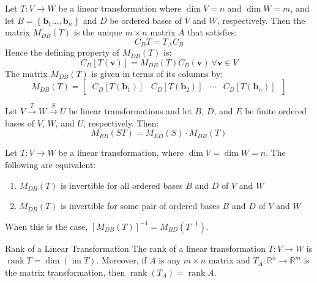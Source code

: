 \documentclass[12pt]{article}
\begin{document}
\begin{theorem}{}{}
    Let $ T : V \to W $ be a linear transformation where $ \dim V = n $ and $ \dim W = m $, and let $ B = \left\{ \mathbf{b}_1 \dots, \mathbf{b}_n \right\} $ and $ D $ be ordered bases of $ V $ and $ W $, respectively. Then the matrix $ M_{DB} \left( T \right) $ is the unique $ m \times n $ matrix $ A $ that satisfies:
    \[ C_D T = T_A C_B \]
    Hence the defining property of $ M_{DB} \left( T \right) $ is:
    \[ C_D \left[ T \left( \mathbf{v} \right) \right] = M_{DB} \left( T \right) C_B \left( \mathbf{v} \right) \ \forall \mathbf{v} \in V \]
    The matrix $ M_{DB} \left( T \right) $ is given in terms of its columns by:
     \[ M_{DB} \left( T \right) = \begin{bmatrix} \ C_D \left[ T \left( \mathbf{b}_1 \right) \right] & C_D \left[ T \left( \mathbf{b}_2 \right) \right] & \cdots & C_D \left[ T \left( \mathbf{b}_n \right) \right] \ \end{bmatrix} \]
\end{theorem}

\begin{theorem}{}{}
    Let $ V \xrightarrow{T} W \xrightarrow{S} U $ be linear transformations and let $ B $, $ D $, and $ E $ be finite ordered bases of $ V $, $ W $, and $ U $, respectively. Then:
    \[ M_{EB} \left( ST \right) = M_{ED} \left( S \right) \cdot M_{DB} \left( T \right) \]
\end{theorem}

\begin{theorem}{}{}
    Let $ T : V \to W $ be a linear transformation, where $ \dim V = \dim W = n $. The following are equivalent:
    \begin{enumerate}[label=(\roman*)]
        \item $ M_{DB} \left( T \right) $ is invertible for all ordered bases $ B $ and $ D $ of $ V $ and $ W $
        \item $ M_{DB} \left( T \right) $ is invertible for some pair of ordered bases $ B $ and $ D $ of $ V $ and $ W $
    \end{enumerate}
    When this is the case, $ \left[ M_{DB} \left( T \right) \right]^{-1} = M_{BD} \left( T^{-1} \right) $.
\end{theorem}

\begin{definition}{Rank of a Linear Transformation}{}
    The rank of a linear transformation $ T : V \to W $ is $ \operatorname{rank} T = \dim \left( \operatorname{im} T \right) $. Moreover, if $ A $ is any $ m \times n $ matrix and $ T_A : \mathbb{R}^n \to \mathbb{R}^m $ is the matrix transformation, then $ \operatorname{rank} \left( T_A \right) = \operatorname{rank} A $.
\end{definition}
\end{document}

